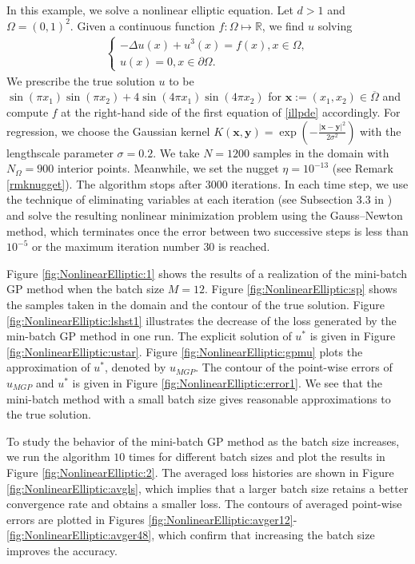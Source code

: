 \documentclass[10pt,reqno]{amsart}
\newcommand{\1}{{\chi}}
\numberwithin{equation}{section}
\theoremstyle{thmlemcorr}
\numberwithin{theorem}{section}
\theoremstyle{thmlemcorr*}
\theoremstyle{defi}
\theoremstyle{remexample}
\theoremstyle{ass}
\begin{document}
In this example, we solve a nonlinear elliptic equation. Let $d>1$ and $\Omega=(0,1)^2$. Given a continuous function $f:\Omega \mapsto \mathbb{R}$, we find $u$ solving 
\begin{align}
	\label{illpde}
	\begin{cases}
		-\Delta u(x) + u^3(x) = f(x), x\in \Omega,\\
		u(x) = 0, x\in \partial \Omega. 
	\end{cases}
\end{align}
We prescribe the true solution $u$ to be $\sin(\pi x_1)\sin(\pi x_2)+4\sin(4\pi x_1)\sin(4\pi x_2)$ for $\boldsymbol{x}:=(x_1, x_2)\in \overline{\Omega}$ and compute $f$ at the right-hand side of the first equation of \eqref{illpde} accordingly. For regression, we choose the Gaussian kernel
$K(\boldsymbol{x}, \boldsymbol{y}) =\operatorname{exp}(-\frac{|\boldsymbol{x}-\boldsymbol{y}|^2}{2\sigma^2})$ with the lengthscale parameter $\sigma=0.2$. We take $N=1200$ samples in the domain with $N_\Omega=900$ interior points. 
Meanwhile, we set the nugget  $\eta=10^{-13}$ (see Remark \ref{rmknugget}). 
The algorithm stops after $3000$ iterations. In each time step, we use the technique of eliminating variables at each iteration (see Subsection 3.3 in \cite{chen2021solving}) and solve the resulting nonlinear minimization problem using the Gauss--Newton method, which terminates once the error between two successive steps is less than $10^{-5}$ or the maximum iteration number $30$ is reached.  



Figure \ref{fig:NonlinearElliptic:1} shows the results of a realization of the mini-batch GP method when the batch size $M=12$. Figure \ref{fig:NonlinearElliptic:sp} shows the samples taken in the domain and the contour of the true solution. Figure \ref{fig:NonlinearElliptic:lshst1} illustrates the decrease of the loss generated by the min-batch GP method in one run. The explicit solution of $u^*$ is given in Figure  \ref{fig:NonlinearElliptic:ustar}. Figure \ref{fig:NonlinearElliptic:gpmu} plots the approximation of $u^*$, denoted by $u_{MGP}$. The contour of the point-wise errors of $u_{MGP}$ and $u^*$ is given in Figure \ref{fig:NonlinearElliptic:error1}.
We see that the mini-batch method with a small batch size gives reasonable approximations to the true solution.

To study the behavior of the mini-batch GP method as the batch size increases, we run the algorithm $10$ times for different batch sizes and plot the results in Figure \ref{fig:NonlinearElliptic:2}. The averaged loss histories are shown in Figure  \ref{fig:NonlinearElliptic:avgls}, which implies that  a larger batch size retains a better convergence rate and obtains a smaller loss. The contours of averaged point-wise errors are plotted in Figures \ref{fig:NonlinearElliptic:avger12}-\ref{fig:NonlinearElliptic:avger48}, which confirm that increasing the batch size improves the accuracy. 
\end{document}
